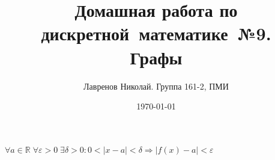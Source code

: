 \documentclass[12pt, tikz]{article}
\title{Домашная работа по дискретной~математике~№9.\\Графы}
\date{\today}
\author{Лавренов Николай. Группа 161-2, ПМИ}
\begin{document}
 $\forall a \in \mathbb{R} \; \forall \varepsilon > 0 \; \exists \delta > 0:
  0 < |x - a| < \delta \Rightarrow |f(x) - a| < \varepsilon$
	
\end{document}
